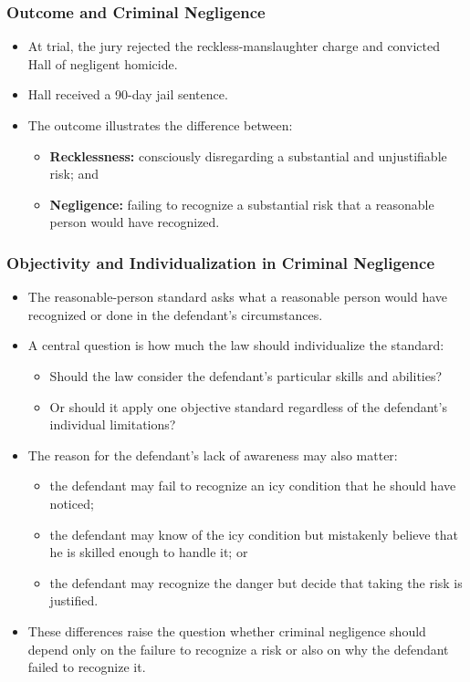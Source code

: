 \documentclass[11pt]{tex/lawoutline}
\begin{document}
\subsubsection{Outcome and Criminal Negligence}
\begin{itemize}
    \item At trial, the jury rejected the reckless-manslaughter charge and convicted Hall of negligent homicide.
    \item Hall received a 90-day jail sentence.
    \item The outcome illustrates the difference between:
    \begin{itemize}
        \item \textbf{Recklessness:} consciously disregarding a substantial and unjustifiable risk; and
        \item \textbf{Negligence:} failing to recognize a substantial risk that a reasonable person would have recognized.
    \end{itemize}
\end{itemize}


\subsubsection{Objectivity and Individualization in Criminal Negligence}
\begin{itemize}
    \item The reasonable-person standard asks what a reasonable person would have recognized or done in the defendant's circumstances.
    \item A central question is how much the law should individualize the standard:
    \begin{itemize}
        \item Should the law consider the defendant's particular skills and abilities?
        \item Or should it apply one objective standard regardless of the defendant's individual limitations?
    \end{itemize}
    \item The reason for the defendant's lack of awareness may also matter:
    \begin{itemize}
        \item the defendant may fail to recognize an icy condition that he should have noticed;
        \item the defendant may know of the icy condition but mistakenly believe that he is skilled enough to handle it; or
        \item the defendant may recognize the danger but decide that taking the risk is justified.
    \end{itemize}
    \item These differences raise the question whether criminal negligence should depend only on the failure to recognize a risk or also on why the defendant failed to recognize it.
\end{itemize}
\end{document}
